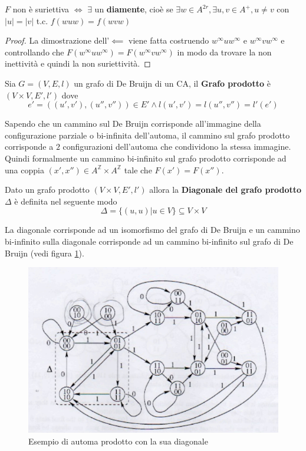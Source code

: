 \begin{teorema}
    $F$ non è suriettiva $\iff$ $\exists$ un \textbf{diamente}, cioè se 
    $\exists w \in A^{2r}, \exists u,v \in A^+, u\ne v$ con $|u|=|v|$ t.c. $f(wuw)=f(wvw)$
    \begin{proof}
        La dimostrazione dell'$\impliedby$ viene fatta costruendo $w^\infty u w^\infty$
        e $w^\infty v w^\infty$ e controllando che $F(w^\infty u w^\infty) = F(w^\infty v w^\infty)$
        in modo da trovare la non inettività e quindi la non suriettività.
    \end{proof}
\end{teorema}

\begin{definizione}
    Sia $G=(V,E,l)$ un grafo di De Bruijn di un CA, il \textbf{Grafo prodotto}
    è $(V\times V,E',l')$ dove $$e'=((u',v'), (u'',v''))\in E'\land l(u',v') = l(u'',v'') = l'(e')$$
\end{definizione}

Sapendo che un cammino sul De Bruijn corrisponde all'immagine della configurazione 
parziale o bi-infinita dell'automa, il cammino sul grafo prodotto corrisponde 
a $2$ configurazioni dell'automa che condividono la stessa immagine. Quindi 
formalmente un cammino bi-infinito sul grafo prodotto corrisponde ad una coppia
$(x',x'')\in A^\mathbb{Z} \times A^\mathbb{Z} $ tale che $F(x')=F(x'')$.

\begin{definizione}
    Dato un grafo prodotto $(V\times V,E',l')$ allora la \textbf{Diagonale del grafo prodotto}
    $\Delta$ è definita nel seguente modo
    $$\Delta = \{(u,u)| u \in V\}\subseteq V\times V$$
\end{definizione}
La diagonale corrisponde ad un isomorfismo del grafo di De Bruijn e un cammino
bi-infinito sulla diagonale corrisponde ad un cammino bi-infinito sul grafo di De
Bruijn (vedi figura \ref{fig:automa_prodotto}). 

\begin{figure}[!h]
    \centering
    \includegraphics[width=.7\textwidth]{img/sistemi_complessi/automa_prodotto.png}
    \caption{Esempio di automa prodotto con la sua diagonale}
    \label{fig:automa_prodotto}
\end{figure}

